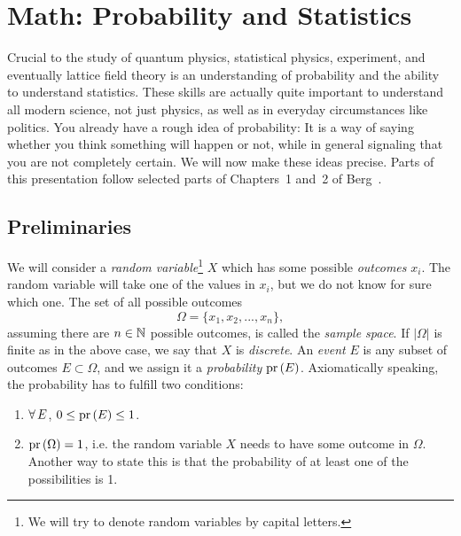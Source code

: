 \chapter{Math: Probability and Statistics}\label{ch:probability}

Crucial to the study of quantum physics, statistical physics, experiment, and
eventually lattice field theory is an understanding of probability and the
ability to understand statistics. These skills are actually quite important to
understand all modern science, not just physics, as well as in everyday
circumstances like politics.
You already have a rough idea of probability: It is a way of saying whether you
think something will happen or not, while in general signaling that you are not
completely certain. We will now make these ideas precise.
Parts of this presentation follow selected parts
of Chapters~1 and~2 of Berg~\cite{berg_markov_2004}.


\section{Preliminaries}\label{sec:probprelim}


We will consider a {\it random variable}\footnote{
We will try to denote random variables by capital letters.} $X$ which
has some possible {\it outcomes} $x_i$. The random variable will take
one of the values in $x_i$, but we do not know for sure which one.
The set of all possible outcomes
\begin{equation}
  \Omega=\{x_1,x_2,...,x_n\},
\end{equation}
assuming there are $n\in\mathbb{N}$ possible outcomes, is called the {\it sample
space}. If $|\Omega|$ is finite as in the above case, we
say that $X$ is {\it discrete}. An {\it event} $E$
is any subset of outcomes $E\subset\Omega$, and we assign it a {\it
probability} $\pr{E}$. Axiomatically speaking, the
probability has to fulfill two conditions:
\begin{enumerate}
  \item $\operatorname{\forall} E$, $0\leq\pr{E}\leq1$.
  \item $\pr{\Omega}=1$, i.e. the random variable $X$ needs to have some outcome
in $\Omega$. Another way to state this is that the probability of at least one
of the possibilities is 1.
\end{enumerate}

